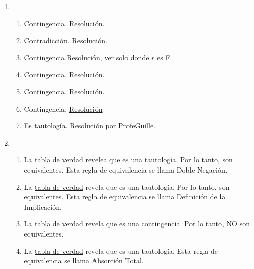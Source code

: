 \documentclass[a4paper]{article}
\newcommand{\exercise}{\item}
\newcommand{\then}{\to}
\begin{document}
\begin{enumerate}
\begin{enumerate} [label=(\alph*)]
		\item $(q\then \neg p)  \land  (r\then \neg p)$ con $p$:"\textit{El pan levará}", $q$:"\textit{Le pones mucha sal}" y $r$:"\textit{Lo dejas en un lugar frío}". Un equivalente es $(q \lor r) \then \neg p$:"\textit{Si le pones mucha sal o lo dejas en un lugar frío, el pan no levará}".
		\item $( p\then q ) \land ( r\then \neg q )$ con $p$:"\textit{Te tomas el 324}", $q$:"\textit{Te deja cerca de la UNQ}" y $p$:"\textit{Te tomás el 65}".  
\end{enumerate}\exercise\begin{enumerate} [label=(\alph*)]		\item Contingencia. \href{https://www.wolframalpha.com/input?i=%28not+p+or+q%29+and+not+q}{Resolución}.
		\item Contradicción. \href{https://www.wolframalpha.com/input?i=truth+table+of%3A+p+and+not+p}{Resolución}.
		\item Contingencia.\href{https://www.wolframalpha.com/input?i=p+and+r+or++q}{Resolución, ver solo donde $r$ es F}.
		\item Contingencia. \href{https://www.wolframalpha.com/input?i=%28p+%3D%3E+q%29+%3D%3E+r}{Resolución}.
		\item Contingencia. \href{https://www.wolframalpha.com/input?i=p+%3C%3D%3E+%28q+xor++r%29}{Resolución}.
		\item Contingencia. \href{https://www.wolframalpha.com/input?i=%28p+nand+q%29+nor+r}{Resolución}
		\item Es tautología. \href{https://youtu.be/k-amMQR3oMc}{Resolución por ProfeGuille}.
\end{enumerate}\exercise\begin{enumerate} [label=(\alph*)]		\item La \href{https://www.wolframalpha.com/input?i=truth+table%3A+not+%28not+p%29+%3C%3D%3E+p}{tabla de verdad} revelea que es una tautología. Por lo tanto, son equivalentes. Esta regla de equivalencia se llama Doble Negación.
		\item La \href{https://www.wolframalpha.com/input?i=%28p+%3D%3E+q%29+%3C%3D%3E+not+q+%3D%3E+not+p}{tabla de verdad} revela que es una tautología. Por lo tanto, son equivalentes. Esta regla de equivalencia se llama Definición de la Implicación.
		\item La \href{https://www.wolframalpha.com/input?i=%28p+%3D%3E+q%29+%3C%3D%3E+%28not+p+%3D%3E+not+q%29}{tabla de verdad} revela que es una contingencia. Por lo tanto, NO son equivalentes.
		\item La \href{https://www.wolframalpha.com/input?i=%28p+and+%28p+or++q%29%29+%3C%3D%3E++p}{tabla de verdad} revela que es una tautología. Esta regla de equivalencia se llama Absorción Total.

\end{enumerate}
\end{enumerate}
\end{document}

